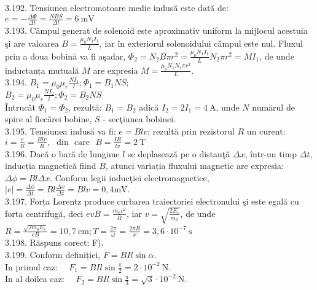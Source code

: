 3.192. Tensiunea electromotoare medie indusă este dată de:\\$e=-\frac{\Delta \Phi}{\Delta t}=\frac{N B S}{\Delta t}=6 \mathrm{~mV}$\\

3.193. Câmpul generat de solenoid este aproximativ uniform la mijlocul acestuia şi are valoarea $B=\frac{\mu_{0} N_{1} I_{1}}{L}$, iar în exteriorul solenoidului câmpul este nul. Fluxul prin a doua bobină va fi aşadar, $\Phi_{2}=N_{2} B \pi r^{2}=\frac{\mu_{0} N_{1} I_{1}}{L} N_{2} \pi r^{2}=M I_{1}$, de unde inductanța mutuală $M$ are expresia $M=\frac{\mu_{0} N_{1} N_{2} \pi r^{2}}{L}$.\\

3.194. $B_{1}=\mu_{0} \mu_{r} \frac{N I_{1}}{l} ; \Phi_{1}=B_{1} N S$;\\$B_{2}=\mu_{0} \mu_{r} \frac{N I_{2}}{l} ; \Phi_{2}=B_{2} N S$\\Întrucât $\Phi_{1}=\Phi_{2}$, rezultă: $B_{1}=B_{2}$ adică $I_{2}=2 I_{1}=4 \mathrm{~A}$, unde $N$ numărul de spire al fiecărei bobine, $S$ - secţiunea bobinei.\\

3.195. Tensiunea indusă va fi: $e=B l v$; rezultă prin rezistorul $R$ un curent:\\$i=\frac{e}{R}=\frac{B l v}{R}, \text { ~din ~care ~} B=\frac{I R}{l v}=2 \mathrm{~T}$\\

3.196. Dacă o bară de lungime $l$ se deplasează pe o distanţă $\Delta x$, într-un timp $\Delta t$, inducția magnetică fiind $B$, atunci variația fluxului magnetic are expresia: $\Delta \phi=B l \Delta x$. Conform legii inducţiei electromagnetice,\\$|e|=\frac{\Delta \phi}{\Delta t}=B l \frac{\Delta x}{\Delta t}=B l v=0,4 \mathrm{mV} .$\\

3.197. Forța Lorentz produce curbarea traiectoriei electronului şi este egală cu forta centrifugă, deci $e v B=\frac{m_{0} v^{2}}{R}$, iar $v=\sqrt{\frac{2 E_{c}}{m_{0}}}$, de unde\\$R=\frac{\sqrt{2 m_{0} E_{c}}}{e B}=10,7 \mathrm{~cm} ; T=\frac{2 \pi}{\omega}=\frac{2 \pi R}{\nu}=3,6 \cdot 10^{-7} \mathrm{~s}$\\

3.198. Răspuns corect: F).\\

3.199. Conform definiției, $F=B I l \sin \alpha$.\\ In primul caz: $\quad F_{1}=B I l \sin \frac{\pi}{2}=2 \cdot 10^{-2} \mathrm{~N}$.\\In al doilea caz: $\quad F_{2}=B I l \sin \frac{\pi}{3}=\sqrt{3} \cdot 10^{-2} \mathrm{~N}$.\\


